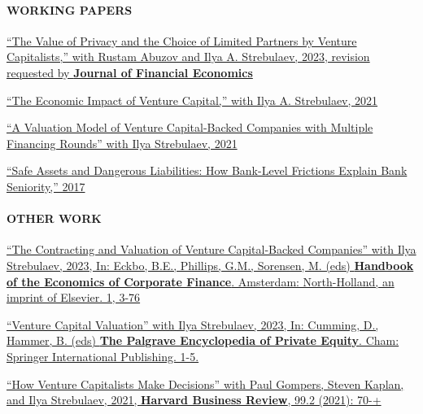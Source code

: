 \documentclass[11pt]{article}
\begin{document}
\paragraph{WORKING PAPERS}
\begin{nondatelist}
    \item \href{https://papers.ssrn.com/sol3/papers.cfm?abstract_id=4235337}{%
        ``The Value of Privacy and the Choice of Limited Partners by Venture Capitalists,'' 
        with Rustam Abuzov and Ilya A. Strebulaev, 
        2023, revision requested by \textbf{Journal of Financial Economics}}

    \item \href{https://papers.ssrn.com/sol3/papers.cfm?abstract_id=2681841}{%
        ``The Economic Impact of Venture Capital,'' 
        with Ilya A. Strebulaev, 
        2021}

    \item \href{https://papers.ssrn.com/sol3/papers.cfm?abstract_id=3725240}{%
        ``A Valuation Model of Venture Capital-Backed Companies with Multiple Financing Rounds'' 
        with Ilya Strebulaev, 
        2021}

    \item \href{https://papers.ssrn.com/sol3/papers.cfm?abstract_id=2526574}{%
        ``Safe Assets and Dangerous Liabilities: How Bank-Level Frictions Explain Bank Seniority,'' 
        2017}
\end{nondatelist}

\paragraph{OTHER WORK}
\begin{nondatelist}
    \item \href{https://papers.ssrn.com/sol3/papers.cfm?abstract_id=4038538}{%
        ``The Contracting and Valuation of Venture Capital-Backed Companies'' 
        with Ilya Strebulaev, 
        2023, In: Eckbo, B.E., Phillips, G.M., Sorensen, M. (eds) \textbf{Handbook of the Economics of Corporate Finance}. Amsterdam: North-Holland, an imprint of Elsevier. 1, 3-76}

    \item \href{https://papers.ssrn.com/sol3/papers.cfm?abstract_id=4038538}{%
        ``Venture Capital Valuation'' 
        with Ilya Strebulaev, 
        2023, In: Cumming, D., Hammer, B. (eds) \textbf{The Palgrave Encyclopedia of Private Equity}. Cham: Springer International Publishing. 1-5.}

    \item \href{https://papers.ssrn.com/sol3/papers.cfm?abstract_id=2801385}{%
        ``How Venture Capitalists Make Decisions'' 
        with Paul Gompers, Steven Kaplan, and Ilya Strebulaev, 
        2021, \textbf{Harvard Business Review}, 99.2 (2021): 70-+}
\end{nondatelist}
\end{document}
